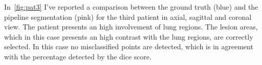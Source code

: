 \documentclass{standalone}
\begin{document}
 	In \figurename\,\ref{fig:pat3} I've reported a comparison between the ground truth (blue) and the pipeline segmentation (pink) for the third patient in axial, sagittal and coronal view. The patient presents an high involvement of lung regions.  The lesion areas, which  in this case presents an high contrast with the lung regions, are correctly selected. In this case no misclassified points are detected, which is in agreement with the percentage detected by the dice score.
 	
 	
	
\end{document}

